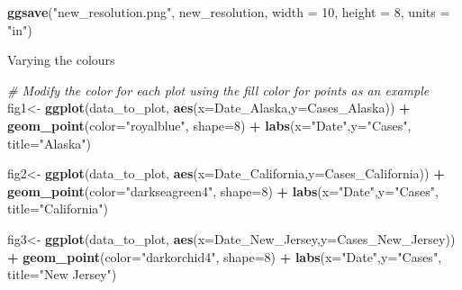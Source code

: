 \documentclass[
]{article}
\newenvironment{Shaded}{\begin{snugshade}}{\end{snugshade}}
\newcommand{\AttributeTok}[1]{\textcolor[rgb]{0.13,0.29,0.53}{#1}}
\newcommand{\CommentTok}[1]{\textcolor[rgb]{0.56,0.35,0.01}{\textit{#1}}}
\newcommand{\DecValTok}[1]{\textcolor[rgb]{0.00,0.00,0.81}{#1}}
\newcommand{\FunctionTok}[1]{\textcolor[rgb]{0.13,0.29,0.53}{\textbf{#1}}}
\newcommand{\NormalTok}[1]{#1}
\newcommand{\OtherTok}[1]{\textcolor[rgb]{0.56,0.35,0.01}{#1}}
\newcommand{\SpecialCharTok}[1]{\textcolor[rgb]{0.81,0.36,0.00}{\textbf{#1}}}
\newcommand{\StringTok}[1]{\textcolor[rgb]{0.31,0.60,0.02}{#1}}
\begin{document}
\begin{Shaded}
\begin{Highlighting}[]
\FunctionTok{ggsave}\NormalTok{(}\StringTok{"new\_resolution.png"}\NormalTok{, new\_resolution, }\AttributeTok{width =} \DecValTok{10}\NormalTok{, }\AttributeTok{height =} \DecValTok{8}\NormalTok{, }\AttributeTok{units =} \StringTok{"in"}\NormalTok{)}
\end{Highlighting}
\end{Shaded}

Varying the colours

\begin{Shaded}
\begin{Highlighting}[]
\CommentTok{\# Modify the color for each plot using the fill color for points as an example}
\NormalTok{fig1}\OtherTok{\textless{}{-}} \FunctionTok{ggplot}\NormalTok{(data\_to\_plot, }\FunctionTok{aes}\NormalTok{(}\AttributeTok{x=}\NormalTok{Date\_Alaska,}\AttributeTok{y=}\NormalTok{Cases\_Alaska)) }\SpecialCharTok{+}
  \FunctionTok{geom\_point}\NormalTok{(}\AttributeTok{color=}\StringTok{"royalblue"}\NormalTok{, }\AttributeTok{shape=}\DecValTok{8}\NormalTok{) }\SpecialCharTok{+} \FunctionTok{labs}\NormalTok{(}\AttributeTok{x=}\StringTok{"Date"}\NormalTok{,}\AttributeTok{y=}\StringTok{"Cases"}\NormalTok{, }\AttributeTok{title=}\StringTok{"Alaska"}\NormalTok{)}

\NormalTok{fig2}\OtherTok{\textless{}{-}} \FunctionTok{ggplot}\NormalTok{(data\_to\_plot, }\FunctionTok{aes}\NormalTok{(}\AttributeTok{x=}\NormalTok{Date\_California,}\AttributeTok{y=}\NormalTok{Cases\_California)) }\SpecialCharTok{+}
  \FunctionTok{geom\_point}\NormalTok{(}\AttributeTok{color=}\StringTok{"darkseagreen4"}\NormalTok{, }\AttributeTok{shape=}\DecValTok{8}\NormalTok{) }\SpecialCharTok{+} \FunctionTok{labs}\NormalTok{(}\AttributeTok{x=}\StringTok{"Date"}\NormalTok{,}\AttributeTok{y=}\StringTok{"Cases"}\NormalTok{, }\AttributeTok{title=}\StringTok{"California"}\NormalTok{)}

\NormalTok{fig3}\OtherTok{\textless{}{-}} \FunctionTok{ggplot}\NormalTok{(data\_to\_plot, }\FunctionTok{aes}\NormalTok{(}\AttributeTok{x=}\NormalTok{Date\_New\_Jersey,}\AttributeTok{y=}\NormalTok{Cases\_New\_Jersey)) }\SpecialCharTok{+}
  \FunctionTok{geom\_point}\NormalTok{(}\AttributeTok{color=}\StringTok{"darkorchid4"}\NormalTok{, }\AttributeTok{shape=}\DecValTok{8}\NormalTok{) }\SpecialCharTok{+} \FunctionTok{labs}\NormalTok{(}\AttributeTok{x=}\StringTok{"Date"}\NormalTok{,}\AttributeTok{y=}\StringTok{"Cases"}\NormalTok{, }\AttributeTok{title=}\StringTok{"New Jersey"}\NormalTok{) }


\end{Highlighting}
\end{Shaded}
\end{document}
